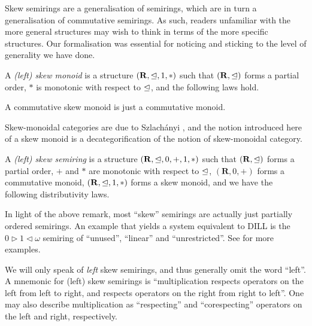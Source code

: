 \documentclass[submission,copyright,creativecommons]{eptcs}
\begin{document}
Skew semirings are a generalisation of semirings, which are in turn a
generalisation of commutative semirings.
As such, readers unfamiliar with the more general structures may wish to think
in terms of the more specific structures.
Our formalisation was essential for noticing and sticking to the level of
generality we have done.

\begin{definition}
  A \emph{(left) skew monoid} is a structure $(\mathbf R, \trianglelefteq, 1, *)$ such
  that $(\mathbf R, \trianglelefteq)$ forms a partial order, $*$ is monotonic with
  respect to $\trianglelefteq$, and the following laws hold.
\end{definition}

\begin{remark}
  A commutative skew monoid is just a commutative monoid.
\end{remark}

Skew-monoidal categories are due to Szlach\'anyi \cite{skew}, and the notion
introduced here of a skew monoid is a decategorification of the notion of
skew-monoidal category.

\begin{definition}
  A \emph{(left) skew semiring} is a structure
  $(\mathbf R, \trianglelefteq, 0, +, 1, *)$ such that $(\mathbf R, \trianglelefteq)$ forms a
  partial order, $+$ and $*$ are monotonic with respect to $\trianglelefteq$,
  $(\mathbf R, 0, +)$ forms a commutative monoid, $(\mathbf R, \trianglelefteq, 1, *)$
  forms a skew monoid, and we have the following distributivity laws.
\end{definition}

\begin{example}
  In light of the above remark, most ``skew'' semirings are actually
  just partially ordered semirings. An example that yields a system
  equivalent to DILL is the $0 \triangleright 1 \triangleleft \omega$
  semiring of ``unused'', ``linear'' and ``unrestricted''. See
  \cite{Granule18} for more examples.
\end{example}

We will only speak of \emph{left} skew semirings, and thus generally
omit the word ``left''.  A mnemonic for (left) skew semirings is
``multiplication respects operators on the left from left to right,
and respects operators on the right from right to left''.  One may
also describe multiplication as ``respecting'' and ``corespecting''
operators on the left and right, respectively.
\end{document}
